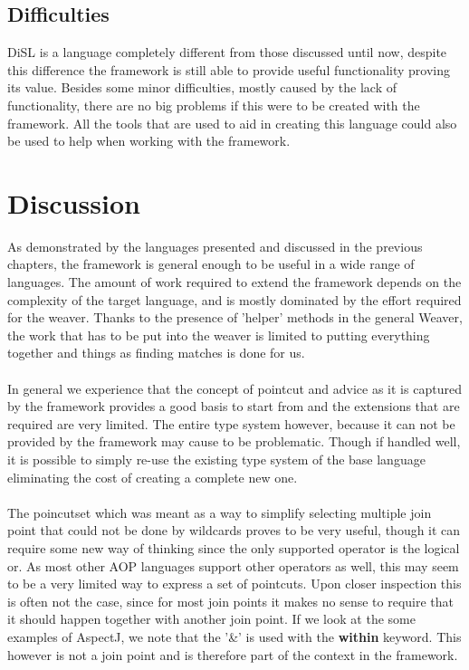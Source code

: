 \documentclass[a4paper]{report}
\begin{document}
\section{Difficulties}
DiSL is a language completely different from those discussed until now, despite this difference the framework is still able to provide useful functionality proving its value. Besides some minor difficulties, mostly caused by the lack of functionality, there are no big problems if this were to be created with the framework. All the tools that are used to aid in creating this language could also be used to help when working with the framework.

\chapter{Discussion}
\label{chap:Discussion}
As demonstrated by the languages presented and discussed in the previous chapters, the framework is general enough to be useful in a wide range of languages. The amount of work required to extend the framework depends on the complexity of the target language, and is mostly dominated by the effort required for the weaver. Thanks to the presence of 'helper' methods in the general Weaver, the work that has to be put into the weaver is limited to putting everything together and things as finding matches is done for us.\\
\\
In general we experience that the concept of pointcut and advice as it is captured by the framework provides a good basis to start from and the extensions that are required are very limited. The entire type system however, because it can not be provided by the framework may cause to be problematic. Though if handled well, it is possible to simply re-use the existing type system of the base language eliminating the cost of creating a complete new one.\\
\\
The poincutset which was meant as a way to simplify selecting multiple join point that could not be done by wildcards proves to be very useful, though it can require some new way of thinking since the only supported operator is the logical or. As most other AOP languages support other operators as well, this may seem to be a very limited way to express a set of pointcuts. Upon closer inspection this is often not the case, since for most join points it makes no sense to require that it should happen together with another join point. If we look at the some examples of AspectJ, we note that the '\&' is used with the \textbf{within} keyword. This however is not a join point and is therefore part of the context in the framework.\\
\end{document}

